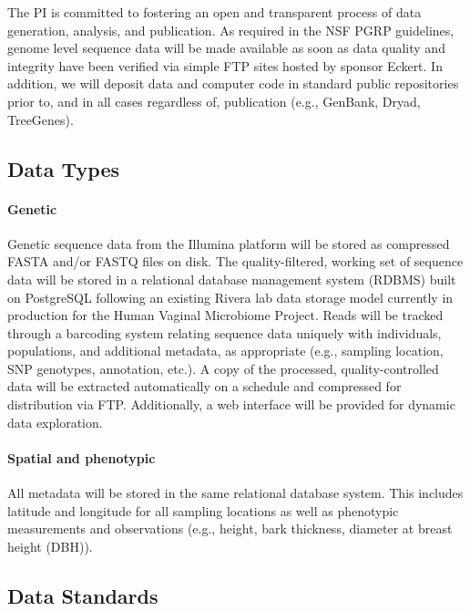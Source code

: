 \newpage
\setcounter{page}{1}


The PI is committed to fostering an open and transparent process of data generation, 
analysis, and publication. As required in the NSF PGRP guidelines, genome level sequence data will be made 
available as soon as data quality and integrity have been verified via simple FTP sites hosted by sponsor Eckert. 
In addition, we will deposit data and computer code in standard public repositories prior to, and in all cases 
regardless of, publication (e.g., GenBank, Dryad, TreeGenes).

\subsection*{Data Types}

\paragraph{Genetic}
Genetic sequence data from the Illumina platform will be stored as compressed FASTA and/or FASTQ files 
on disk. The quality-filtered, working set of sequence data will be stored in a relational database management system 
(RDBMS) built on PostgreSQL following an existing Rivera lab data storage model currently in production 
for the Human Vaginal Microbiome Project. Reads will be tracked through a barcoding system relating 
sequence data uniquely with individuals, populations, and additional metadata, as appropriate (e.g., sampling 
location, SNP genotypes, annotation, etc.).  A copy of the processed, quality-controlled data will be extracted 
automatically on a schedule and compressed for distribution via FTP.  Additionally, a web interface will be provided for 
dynamic data exploration.

\paragraph{Spatial and phenotypic}
All metadata will be stored in the same relational database system.  This includes latitude and longitude for all sampling
locations as well as phenotypic measurements and observations (e.g., height, bark thickness, diameter at breast height (DBH)).

\subsection*{Data Standards}

